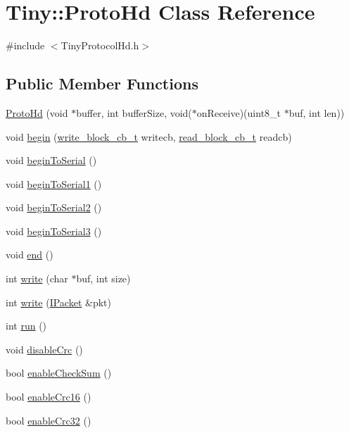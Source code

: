 \hypertarget{classTiny_1_1ProtoHd}{}\section{Tiny\+:\+:Proto\+Hd Class Reference}
\label{classTiny_1_1ProtoHd}


{\ttfamily \#include $<$Tiny\+Protocol\+Hd.\+h$>$}

\subsection*{Public Member Functions}
\begin{DoxyCompactItemize}
\item 
\hyperlink{classTiny_1_1ProtoHd_a1a55191980c259f2c760997d9c07cb48}{Proto\+Hd} (void $\ast$buffer, int buffer\+Size, void($\ast$on\+Receive)(uint8\+\_\+t $\ast$buf, int len))
\item 
void \hyperlink{classTiny_1_1ProtoHd_a112ae02531837a852af7ca3c9a32a7eb}{begin} (\hyperlink{tiny__types_8h_aafd634660bba76cace57a8f9b01e044d}{write\+\_\+block\+\_\+cb\+\_\+t} writecb, \hyperlink{tiny__types_8h_a15bec127d9ee63658563d62e92b5261b}{read\+\_\+block\+\_\+cb\+\_\+t} readcb)
\item 
void \hyperlink{classTiny_1_1ProtoHd_a0e88ac5b3c67ca67c566742c22180050}{begin\+To\+Serial} ()
\item 
void \hyperlink{classTiny_1_1ProtoHd_a1b2975217b0523c3de4b534644cfa501}{begin\+To\+Serial1} ()
\item 
void \hyperlink{classTiny_1_1ProtoHd_a450fc792e515ffd150072988bc632c9e}{begin\+To\+Serial2} ()
\item 
void \hyperlink{classTiny_1_1ProtoHd_acd6519f6652c279b3a3b98aabbaeed65}{begin\+To\+Serial3} ()
\item 
void \hyperlink{classTiny_1_1ProtoHd_ac87bf8264895b654025001a0e6014f3f}{end} ()
\item 
int \hyperlink{classTiny_1_1ProtoHd_af53c8817317d3a62535e68ca236a038f}{write} (char $\ast$buf, int size)
\item 
int \hyperlink{classTiny_1_1ProtoHd_a1f4e0864f08191bfc66dce68b339250f}{write} (\hyperlink{classTiny_1_1IPacket}{I\+Packet} \&pkt)
\item 
int \hyperlink{classTiny_1_1ProtoHd_af07b1f5d0df3021e00a4b4f04af4150b}{run} ()
\item 
void \hyperlink{classTiny_1_1ProtoHd_ae90a0a40de0b71a015f7f7f940440fa0}{disable\+Crc} ()
\item 
bool \hyperlink{classTiny_1_1ProtoHd_ace4e6b993532b3eb47d025b8db94192d}{enable\+Check\+Sum} ()
\item 
bool \hyperlink{classTiny_1_1ProtoHd_a0887adedc93b7538dbaef3fc8e0b2819}{enable\+Crc16} ()
\item 
bool \hyperlink{classTiny_1_1ProtoHd_a4110a0112548d5e47d312d190930ad20}{enable\+Crc32} ()
\end{DoxyCompactItemize}



